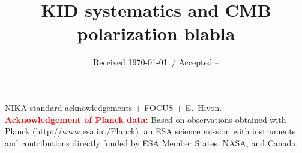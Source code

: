 \documentclass[twocolumn, traditabstract]{aa}
\newcommand{\todo}[1]{\textcolor{red}{\textbf{#1}}}
\begin{document}
\title{KID systematics and CMB polarization blabla}

\date{Received \today \ / Accepted --}
	
\tableofcontents
\maketitle







\clearpage
\newpage

 


\begin{acknowledgements}
NIKA standard acknowledgements + FOCUS + E.~Hivon.\\
\todo{Acknowledgement of Planck data:} Based on observations obtained with Planck
(http://www.esa.int/Planck), an ESA science mission with instruments and
contributions directly funded by ESA Member States, NASA, and Canada.
\end{acknowledgements}
\end{document}
